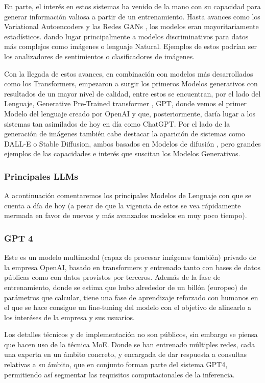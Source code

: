 En parte, el interés en estos sistemas ha venido de la mano con su capacidad para generar información valiosa a partir de un entrenamiento. Hasta avances como los Variational Autoencoders \cite{kingma2013auto} y las Redes GANs \cite{goodfellow2014generative}, los modelos eran mayoritariamente estadísticos. dando lugar principalmente a modelos discriminativos para datos más complejos como imágenes o lenguaje Natural. Ejemplos de estos podrían ser los analizadores de sentimientos o clasificadores de imágenes.

Con la llegada de estos avances, en combinación con modelos más desarrollados como los Transformers, empezaron a surgir los primeros Modelos generativos con resultados de un mayor nivel de calidad, entre estos se encuentran, por el lado del Lenguaje, Generative Pre-Trained transformer \cite{radford2018improving}, GPT, donde vemos el primer Modelo del lenguaje creado por OpenAI y que, posteriormente, daría lugar a los sistemas tan asimilados de hoy en día como ChatGPT. Por el lado de la generación de imágenes también cabe destacar la aparición de sistemas como DALL-E o Stable Diffusion, ambos basados en Modelos de difusión \cite{}, pero grandes ejemplos de las capacidades e interés que suscitan los Modelos Generativos.

\subsubsection{Principales LLMs}

A acontinuación comentaremos los principales Modelos de Lenguaje con que se cuenta a día de hoy (a pesar de que la vigencia de estos se vea rápidamente mermada en favor de nuevos y más avanzados modelos en muy poco tiempo). 

\subsubsection{GPT 4}

Este es un modelo multimodal (capaz de procesar imágenes también) privado de la empresa OpenAI, basado en transformers y entrenado tanto con bases de datos públicas como con datos provistos por terceros. Además de la fase de entrenamiento, donde se estima que hubo alrededor de un billón (europeo) de parámetros que calcular, tiene una fase de aprendizaje reforzado con humanos en el que se hace consigue un fine-tuning del modelo con el objetivo de alinearlo a los interéses de la empresa y sus usuarios.

Los detalles técnicos y de implementación no son públicos, sin embargo se piensa que hacen uso de la técnica MoE. Donde se han entrenado múltiples redes, cada una experta en un ámbito concreto, y encargada de dar respuesta a consultas relativas a su ámbito, que en conjunto forman parte del sistema GPT4, permitiendo así segmentar las requisitos computacionales de la inferencia.

